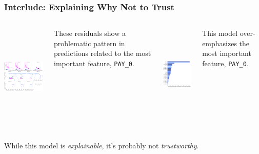 \documentclass[11pt,
               aspectratio=169,
               hyperref={colorlinks}
               ]{beamer}
\begin{document}
			
			\begin{frame}
		
				\frametitle{Interlude: Explaining Why Not to Trust}		
			

				\begin{columns}
	
					\centering
					\includegraphics[height=140pt]{img/resid.png}
					
					\tiny{These residuals show a problematic pattern in predictions related to the most important feature, \texttt{PAY\_0}.}
				
					
					\centering
					\includegraphics[height=132pt]{img/global_shap.png}
					
					\tiny{This model over-emphasizes the most important feature, \texttt{PAY\_0}.}
				
				\end{columns}
			
				\vspace{10pt}
			
				\centering
				\footnotesize{While this model is \textit{explainable}, it's probably not \textit{trustworthy}.}
			
			\end{frame}
			
\end{document}
